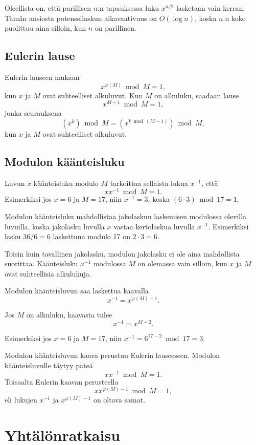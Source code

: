 Oleellista on, että parillisen $n$:n
tapauksessa luku $x^{n/2}$ lasketaan vain kerran.
Tämän ansiosta potenssilaskun aikavaativuus on $O(\log n)$,
koska $n$:n koko puolittuu aina silloin,
kun $n$ on parillinen.

\subsection{Eulerin lause}

Eulerin lauseen mukaan
\[x^{\varphi(M)} \bmod M = 1,\]
kun $x$ ja $M$ ovat suhteelliset alkuluvut.
Kun $M$ on alkuluku, saadaan lause
\[x^{M-1} \bmod M = 1,\]
jonka seurauksena
\[(x^k) \bmod M =  (x^{k \bmod (M-1)}) \bmod M,\]
kun $x$ ja $M$ ovat suhteelliset alkuluvut.

\subsection{Modulon käänteisluku}

Luvun $x$ käänteisluku modulo $M$
tarkoittaa sellaista lukua $x^{-1}$,
että
\[ x x^{-1} \bmod M = 1. \]
Esimerkiksi jos $x=6$ ja $M=17$,
niin $x^{-1}=3$, koska $(6\cdot3) \bmod 17=1$.

Modulon käänteisluku mahdollistaa
jakolaskun laskemisen modulossa
olevilla luvuilla,
koska jakolasku luvulla $x$ vastaa
kertolaskua luvulla $x^{-1}$.
Esimerkiksi lasku $36/6=6$ laskettuna
modulo 17 on $2 \cdot 3 = 6$.

Toisin kuin tavallinen jakolasku,
modulon jakolasku ei ole aina mahdollista suorittaa.
Käänteisluku $x^{-1}$ modulossa $M$
on olemassa vain silloin,
kun $x$ ja $M$ ovat suhteellisia alkulukuja.

Modulon käänteisluvun saa laskettua kaavalla
\[
x^{-1} = x^{\varphi(M)-1}.
\]

Jos $M$ on alkuluku, kaavasta tulee
\[
x^{-1} = x^{M-2}.
\]

Esimerkiksi jos $x=6$ ja $M=17$, niin
$x^{-1}=6^{17-2} \bmod 17 = 3$.

Modulon käänteisluvun kaava perustuu Eulerin
lauseeseen.
Modulon käänteisluvulle täytyy päteä
\[
x x^{-1} \bmod M = 1.
\]
Toisaalta Eulerin kaavan perusteella
\[
xx^{\varphi(M)-1} \bmod M = 1,
\]
eli lukujen $x^{-1}$ ja $x^{\varphi(M)-1}$ on oltava samat.

\section{Yhtälönratkaisu}


